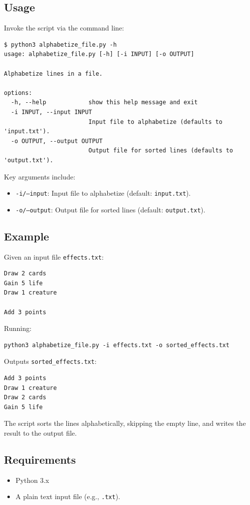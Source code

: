 \subsection{Usage}
Invoke the script via the command line:
\begin{lstlisting}[style=terminalstyle]
$ python3 alphabetize_file.py -h
usage: alphabetize_file.py [-h] [-i INPUT] [-o OUTPUT]

Alphabetize lines in a file.

options:
  -h, --help            show this help message and exit
  -i INPUT, --input INPUT
                        Input file to alphabetize (defaults to 'input.txt').
  -o OUTPUT, --output OUTPUT
                        Output file for sorted lines (defaults to 'output.txt').

\end{lstlisting}
Key arguments include:
\begin{itemize}
    \item \texttt{-i/--input}: Input file to alphabetize (default: \texttt{input.txt}).
    \item \texttt{-o/--output}: Output file for sorted lines (default: \texttt{output.txt}).
\end{itemize}

\subsection{Example}
Given an input file \texttt{effects.txt}:
\begin{lstlisting}
Draw 2 cards
Gain 5 life
Draw 1 creature

Add 3 points
\end{lstlisting}
Running:
\begin{lstlisting}[style=terminalstyle]
python3 alphabetize_file.py -i effects.txt -o sorted_effects.txt
\end{lstlisting}
Outputs \texttt{sorted\_effects.txt}:
\begin{lstlisting}
Add 3 points
Draw 1 creature
Draw 2 cards
Gain 5 life
\end{lstlisting}
The script sorts the lines alphabetically, skipping the empty line, and writes the result to the output file.

\subsection{Requirements}
\begin{itemize}
    \item Python 3.x
    \item A plain text input file (e.g., \texttt{.txt}).
\end{itemize}


